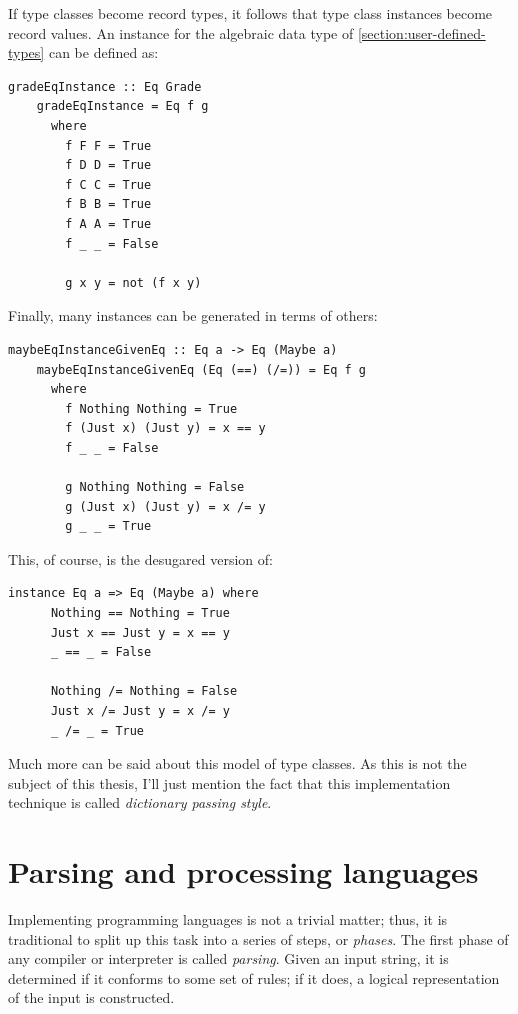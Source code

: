 \documentclass[UdineBachThesis,american,11pt]{PhdThesis}
\begin{document}
  If type classes become record types, it follows that type class instances
  become record values. An \lstinline@Eq@ instance for the algebraic data type
  \lstinline@Grade@ of \autoref{section:user-defined-types} can be defined as:

  \begin{lstlisting}[gobble=4,basicstyle=\ttfamily\small]
    gradeEqInstance :: Eq Grade
    gradeEqInstance = Eq f g
      where
        f F F = True
        f D D = True
        f C C = True
        f B B = True
        f A A = True
        f _ _ = False

        g x y = not (f x y)
  \end{lstlisting}

  \newpage

  Finally, many instances can be generated in terms of others:

  \begin{lstlisting}[gobble=4,basicstyle=\ttfamily\small]
    maybeEqInstanceGivenEq :: Eq a -> Eq (Maybe a)
    maybeEqInstanceGivenEq (Eq (==) (/=)) = Eq f g
      where
        f Nothing Nothing = True
        f (Just x) (Just y) = x == y
        f _ _ = False

        g Nothing Nothing = False
        g (Just x) (Just y) = x /= y
        g _ _ = True
  \end{lstlisting}

  This, of course, is the desugared version of:

  \begin{lstlisting}[gobble=4,basicstyle=\ttfamily\small]
    instance Eq a => Eq (Maybe a) where
      Nothing == Nothing = True
      Just x == Just y = x == y
      _ == _ = False

      Nothing /= Nothing = False
      Just x /= Just y = x /= y
      _ /= _ = True
  \end{lstlisting}

  Much more can be said about this model of type classes. As this is not the
  subject of this thesis, I'll just mention the fact that this implementation
  technique is called \emph{dictionary passing style}.

  \chapter{Parsing and processing languages}

  Implementing programming languages is not a trivial matter; thus, it is
  traditional to split up this task into a series of steps, or \emph{phases}.
  The first phase of any compiler or interpreter is called \emph{parsing}. Given
  an input string, it is determined if it conforms to some set of rules; if it
  does, a logical representation of the input is constructed.
\end{document}
